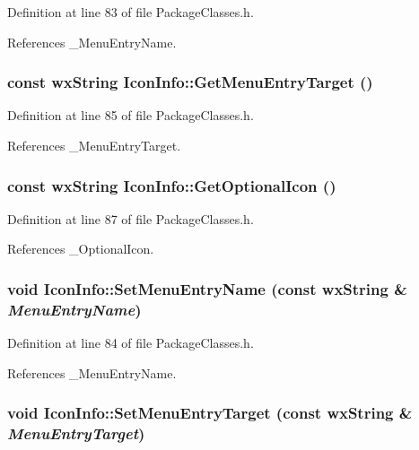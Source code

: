 Definition at line 83 of file Package\-Classes.h.

References \_\-Menu\-Entry\-Name.
\subsubsection{\setlength{\rightskip}{0pt plus 5cm}const wx\-String Icon\-Info::Get\-Menu\-Entry\-Target ()\hspace{0.3cm}{\tt  [inline]}}\label{class_icon_info_1ce3b131650e0b39d80848bce5195727}




Definition at line 85 of file Package\-Classes.h.

References \_\-Menu\-Entry\-Target.
\subsubsection{\setlength{\rightskip}{0pt plus 5cm}const wx\-String Icon\-Info::Get\-Optional\-Icon ()\hspace{0.3cm}{\tt  [inline]}}\label{class_icon_info_f5b28a6dd24b567c7466773327c1b061}




Definition at line 87 of file Package\-Classes.h.

References \_\-Optional\-Icon.
\subsubsection{\setlength{\rightskip}{0pt plus 5cm}void Icon\-Info::Set\-Menu\-Entry\-Name (const wx\-String \& {\em Menu\-Entry\-Name})\hspace{0.3cm}{\tt  [inline]}}\label{class_icon_info_c4348f4bf4b1e4c5d4450f804382135a}




Definition at line 84 of file Package\-Classes.h.

References \_\-Menu\-Entry\-Name.
\subsubsection{\setlength{\rightskip}{0pt plus 5cm}void Icon\-Info::Set\-Menu\-Entry\-Target (const wx\-String \& {\em Menu\-Entry\-Target})\hspace{0.3cm}{\tt  [inline]}}\label{class_icon_info_f984790a296a889f2b21596fa34e0f96}




